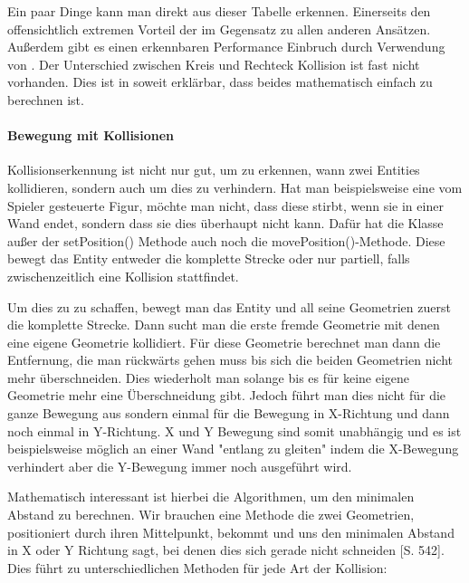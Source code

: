 \vspace*{1 cm}

Ein paar Dinge kann man direkt aus dieser Tabelle erkennen. Einerseits den offensichtlich extremen Vorteil der  im Gegensatz zu allen anderen Ansätzen. Außerdem gibt es einen erkennbaren Performance Einbruch durch Verwendung von . Der Unterschied zwischen Kreis und Rechteck Kollision ist fast nicht vorhanden. Dies ist in soweit erklärbar, dass beides mathematisch einfach zu berechnen ist.


\paragraph{Bewegung mit Kollisionen}

Kollisionserkennung ist nicht nur gut, um zu erkennen, wann zwei Entities kollidieren, sondern auch um dies zu verhindern. Hat man beispielsweise eine vom Spieler gesteuerte Figur, möchte man nicht, dass diese stirbt, wenn sie in einer Wand endet, sondern dass sie dies überhaupt nicht kann.
Dafür hat die Klasse  außer der setPosition() Methode auch noch die movePosition()-Methode. Diese bewegt das Entity entweder die komplette Strecke oder nur partiell, falls zwischenzeitlich eine Kollision stattfindet.

Um dies zu zu schaffen, bewegt man das Entity und all seine Geometrien zuerst die komplette Strecke. Dann sucht man die erste fremde Geometrie mit denen eine eigene Geometrie kollidiert. Für diese Geometrie berechnet man dann die Entfernung, die man rückwärts gehen muss bis sich die beiden Geometrien nicht mehr überschneiden. Dies wiederholt man solange bis es für keine eigene Geometrie mehr eine Überschneidung gibt. Jedoch führt man dies nicht für die ganze Bewegung aus sondern einmal für die Bewegung in X-Richtung und dann noch einmal in Y-Richtung. X und Y Bewegung sind somit unabhängig und es ist beispielsweise möglich an einer Wand "entlang zu gleiten" indem die X-Bewegung verhindert aber die Y-Bewegung immer noch ausgeführt wird.

Mathematisch interessant ist hierbei die Algorithmen, um den minimalen Abstand zu berechnen. Wir brauchen eine Methode die zwei Geometrien, positioniert durch ihren Mittelpunkt, bekommt und uns den minimalen Abstand in X oder Y Richtung sagt, bei denen dies sich gerade nicht schneiden \cite{EMFGAIA}[S. 542]. Dies führt zu unterschiedlichen Methoden für jede Art der Kollision:

